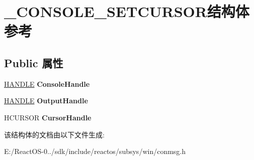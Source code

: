 \hypertarget{struct___c_o_n_s_o_l_e___s_e_t_c_u_r_s_o_r}{}\section{\+\_\+\+C\+O\+N\+S\+O\+L\+E\+\_\+\+S\+E\+T\+C\+U\+R\+S\+O\+R结构体 参考}
\label{struct___c_o_n_s_o_l_e___s_e_t_c_u_r_s_o_r}
\subsection*{Public 属性}
\begin{DoxyCompactItemize}
\item 
\mbox{\label{struct___c_o_n_s_o_l_e___s_e_t_c_u_r_s_o_r_a6ae11204772606f3c999ccc3394dab78}} 
\hyperlink{interfacevoid}{H\+A\+N\+D\+LE} {\bfseries Console\+Handle}
\item 
\mbox{\label{struct___c_o_n_s_o_l_e___s_e_t_c_u_r_s_o_r_a913477a3f9575468693b11636b8959de}} 
\hyperlink{interfacevoid}{H\+A\+N\+D\+LE} {\bfseries Output\+Handle}
\item 
\mbox{\label{struct___c_o_n_s_o_l_e___s_e_t_c_u_r_s_o_r_a6c24df356efca62bffbeea79f9776b65}} 
H\+C\+U\+R\+S\+OR {\bfseries Cursor\+Handle}
\end{DoxyCompactItemize}


该结构体的文档由以下文件生成\+:\begin{DoxyCompactItemize}
\item 
E\+:/\+React\+O\+S-\/0../sdk/include/reactos/subsys/win/conmsg.\+h\end{DoxyCompactItemize}

